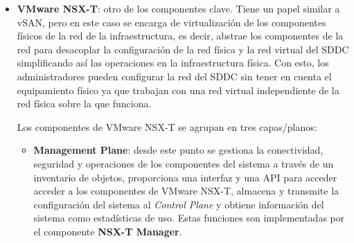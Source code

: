 \begin{itemize}
    \item \textbf{VMware NSX-T}: otro de los componentes clave. Tiene un papel similar a vSAN, pero en este caso se encarga de virtualización de los componentes físicos de la red de la infraestructura, es decir, abstrae los componentes de la red para desacoplar la configuración de la red física y la red virtual del SDDC simplificando así las operaciones en la infraestructura física. Con esto, los administradores pueden configurar la red del SDDC sin tener en cuenta el equipamiento físico ya que trabajan con una red virtual independiente de la red física sobre la que funciona.

    Los componentes de VMware NSX-T se agrupan en tres capas/planos\cite{componentesNSX}:
    \begin{itemize}
        \item \textbf{Management Plane}: desde este punto se gestiona la conectividad, seguridad y operaciones de los componentes del sistema a través de un inventario de objetos, proporciona una interfaz y una API para acceder acceder a los componentes de VMware NSX-T, almacena y transmite la configuración del sistema al \textit{Control Plane} y obtiene información del sistema como estadísticas de uso. Estas funciones son implementadas por el componente \textbf{NSX-T Manager}.
            

\end{itemize}
\end{itemize}
